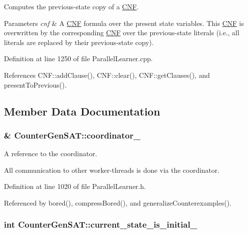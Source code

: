 Computes the previous-\/state copy of a \hyperlink{classCNF}{C\-N\-F}. 


\begin{DoxyParams}{Parameters}
{\em cnf} & A \hyperlink{classCNF}{C\-N\-F} formula over the present state variables. This \hyperlink{classCNF}{C\-N\-F} is overwritten by the corresponding \hyperlink{classCNF}{C\-N\-F} over the previous-\/state literals (i.\-e., all literals are replaced by their previous-\/state copy). \\
\hline
\end{DoxyParams}


Definition at line 1250 of file Parallel\-Learner.\-cpp.



References C\-N\-F\-::add\-Clause(), C\-N\-F\-::clear(), C\-N\-F\-::get\-Clauses(), and present\-To\-Previous().



\subsection{Member Data Documentation}
\hypertarget{classCounterGenSAT_a90c79c0fa427fcd2dacd760421f5afe4}{
\subsubsection[{coordinator\-\_\-}]{\& Counter\-Gen\-S\-A\-T\-::coordinator\-\_\-\hspace{0.3cm}{\ttfamily [protected]}}}\label{classCounterGenSAT_a90c79c0fa427fcd2dacd760421f5afe4}


A reference to the coordinator. 

All communication to other worker-\/threads is done via the coordinator. 

Definition at line 1020 of file Parallel\-Learner.\-h.



Referenced by bored(), compress\-Bored(), and generalize\-Counterexamples().

\hypertarget{classCounterGenSAT_a578a95e6b9eb1b1b19419c0acb3248fa}{
\subsubsection[{current\-\_\-state\-\_\-is\-\_\-initial\-\_\-}]{\setlength{\rightskip}{0pt plus 5cm}int Counter\-Gen\-S\-A\-T\-::current\-\_\-state\-\_\-is\-\_\-initial\-\_\-\hspace{0.3cm}{\ttfamily [protected]}}}\label{classCounterGenSAT_a578a95e6b9eb1b1b19419c0acb3248fa}



